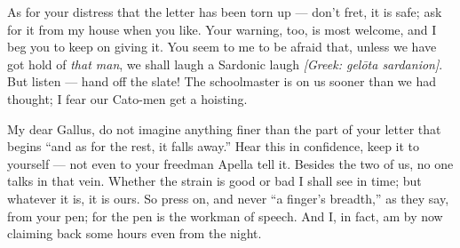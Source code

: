 

 As for your distress that the letter has been torn up --- don't fret, it is safe; ask for it from my house when you like. Your warning, too, is most welcome, and I beg you to keep on giving it. You seem to me to be afraid that, unless we have got hold of \textit{that man}, we shall laugh a Sardonic laugh \textit{[Greek: gelōta sardanion]}. But listen --- hand off the slate! The schoolmaster is on us sooner than we had thought; I fear our Cato-men get a hoisting.

 My dear Gallus, do not imagine anything finer than the part of your letter that begins ``and as for the rest, it falls away.'' Hear this in confidence, keep it to yourself --- not even to your freedman Apella tell it. Besides the two of us, no one talks in that vein. Whether the strain is good or bad I shall see in time; but whatever it is, it is ours. So press on, and never ``a finger's breadth,'' as they say, from your pen; for the pen is the workman of speech. And I, in fact, am by now claiming back some hours even from the night.
